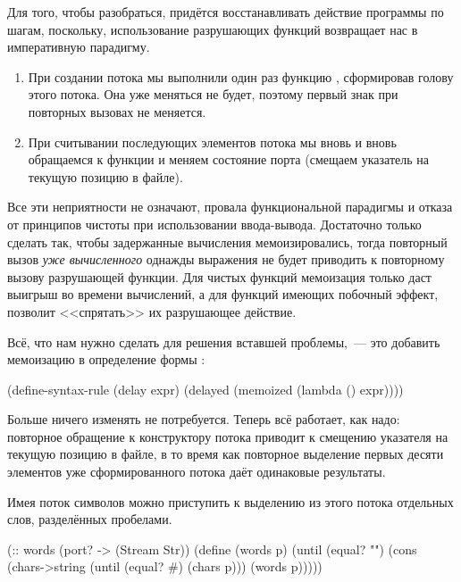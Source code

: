 {Для того, чтобы разобраться, придётся восстанавливать действие программы по шагам, поскольку, использование разрушающих функций возвращает нас в императивную парадигму.
\begin{enumerate}
\item При создании потока  мы выполнили один раз функцию , сформировав голову этого потока. Она уже меняться не будет, поэтому первый знак \s{#\o} при повторных вызовах не меняется.
\item При считывании последующих элементов потока мы вновь и вновь обращаемся к функции   и меняем состояние порта (смещаем указатель на текущую позицию в файле).
\end{enumerate}
Все эти неприятности не означают, провала функциональной парадигмы и отказа от принципов чистоты при использовании ввода-вывода. Достаточно только сделать так, чтобы задержанные вычисления мемоизировались, тогда повторный вызов \emph{уже вычисленного} однажды выражения не будет приводить к повторному вызову разрушающей функции. Для чистых функций мемоизация только даст выигрыш во времени вычислений, а для функций имеющих побочный эффект, позволит <<спрятать>> их разрушающее действие.

Всё, что нам нужно сделать для решения вставшей проблемы,~--- это добавить мемоизацию в определение формы :
\begin{Definition}
(define-syntax-rule (delay expr)
  (delayed (memoized (lambda () expr))))
\end{Definition}
Больше ничего изменять не потребуется. Теперь всё работает, как надо: повторное обращение к конструктору потока  приводит к смещению указателя на текущую позицию в файле, в то время как повторное выделение первых десяти элементов уже сформированного потока  даёт одинаковые результаты.


Имея поток символов можно приступить к выделению из этого потока отдельных слов, разделённых пробелами.
\begin{Definition}
(:: words (port? -> (Stream Str))
  (define (words p) 
    (until (equal? "")
           (cons~ (chars->string (until (equal? #\space) 
                                        (chars p)))
             (words p)))))


\end{Definition}}
